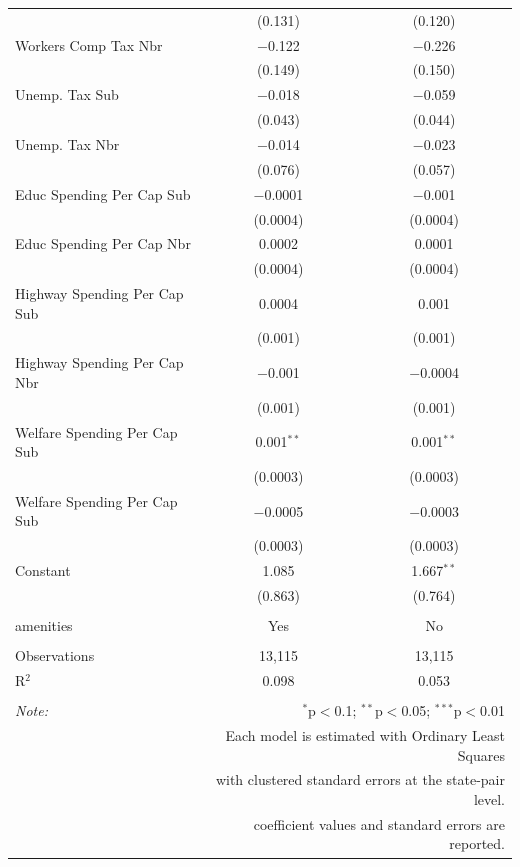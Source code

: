 \documentclass[12pt,a4paper]{article}
\begin{document}
\begin{table}[!htbp]
\begin{tabular}{@{\extracolsep{5pt}}lcc}
  & (0.131) & (0.120) \\ 
  Workers Comp Tax Nbr & $-$0.122 & $-$0.226 \\ 
  & (0.149) & (0.150) \\ 
  Unemp. Tax Sub & $-$0.018 & $-$0.059 \\ 
  & (0.043) & (0.044) \\ 
  Unemp. Tax Nbr & $-$0.014 & $-$0.023 \\ 
  & (0.076) & (0.057) \\ 
  Educ Spending Per Cap Sub & $-$0.0001 & $-$0.001 \\ 
  & (0.0004) & (0.0004) \\ 
  Educ Spending Per Cap Nbr & 0.0002 & 0.0001 \\ 
  & (0.0004) & (0.0004) \\ 
  Highway Spending Per Cap Sub & 0.0004 & 0.001 \\ 
  & (0.001) & (0.001) \\ 
  Highway Spending Per Cap Nbr & $-$0.001 & $-$0.0004 \\ 
  & (0.001) & (0.001) \\ 
  Welfare Spending Per Cap Sub & 0.001$^{**}$ & 0.001$^{**}$ \\ 
  & (0.0003) & (0.0003) \\ 
  Welfare Spending Per Cap Sub & $-$0.0005 & $-$0.0003 \\ 
  & (0.0003) & (0.0003) \\ 
  Constant & 1.085 & 1.667$^{**}$ \\ 
  & (0.863) & (0.764) \\ 
 \hline \\[-1.8ex] 
amenities & Yes & No \\ 
\hline \\[-1.8ex] 
Observations & 13,115 & 13,115 \\ 
R$^{2}$ & 0.098 & 0.053 \\ 
\hline 
\hline \\[-1.8ex] 
\textit{Note:}  & \multicolumn{2}{r}{$^{*}$p$<$0.1; $^{**}$p$<$0.05; $^{***}$p$<$0.01} \\ 
 & \multicolumn{2}{r}{Each model is estimated with Ordinary Least Squares} \\ 
 & \multicolumn{2}{r}{with clustered standard errors at the state-pair level.} \\ 
 & \multicolumn{2}{r}{coefficient values and standard errors are reported.} \\ 
\end{tabular} 
\end{table} 
\end{document}
